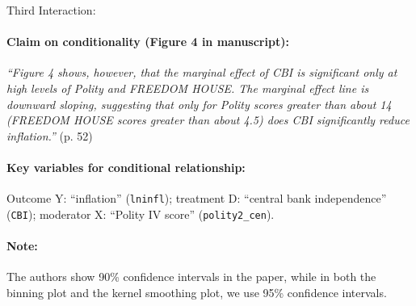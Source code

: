 \documentclass[12pt]{article}
\begin{document}
\noindent Third Interaction:

\paragraph{Claim on conditionality (Figure 4 in manuscript):}

\emph{``Figure 4 shows, however, that the marginal effect of CBI is
  significant only at high levels of Polity and FREEDOM HOUSE. The
  marginal effect line is downward sloping, suggesting that only for
  Polity scores greater than about 14 (FREEDOM HOUSE scores greater
  than about 4.5) does CBI significantly reduce inflation.''} (p. 52)

\paragraph{Key variables for conditional relationship:} Outcome Y:
``inflation'' (\texttt{lninfl}); treatment D: ``central bank
independence'' (\texttt{CBI}); moderator X: ``Polity IV score'' (\texttt{polity2\_cen}).

\paragraph{Note:} The authors show 90\% confidence intervals in the paper, while in both the binning plot and the kernel smoothing plot, we use 95\% confidence intervals.
\end{document}
